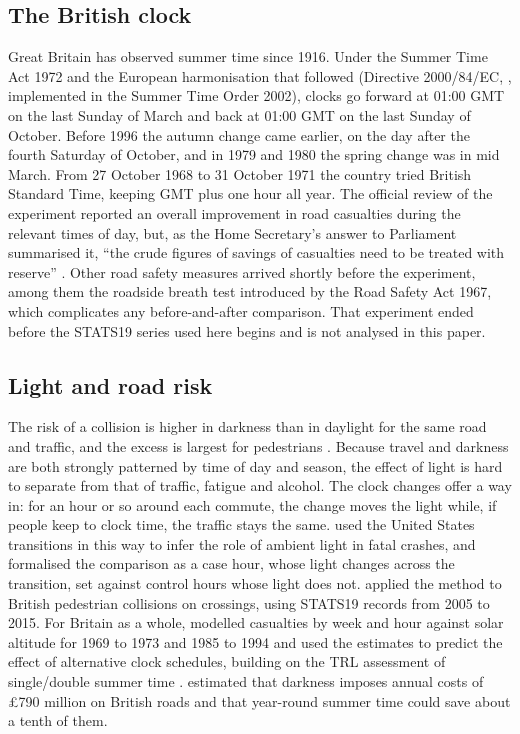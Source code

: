\documentclass[11pt,a4paper]{article}
\begin{document}
\subsection{The British clock}
Great Britain has observed summer time since 1916. Under the Summer Time Act 1972 \citep{summertimeact1972} and the European harmonisation that followed (Directive 2000/84/EC, \citealp{eu2001}, implemented in the Summer Time Order 2002), clocks go forward at 01:00 GMT on the last Sunday of March and back at 01:00 GMT on the last Sunday of October. Before 1996 the autumn change came earlier, on the day after the fourth Saturday of October, and in 1979 and 1980 the spring change was in mid March. From 27 October 1968 to 31 October 1971 the country tried British Standard Time, keeping GMT plus one hour all year. The official review of the experiment reported an overall improvement in road casualties during the relevant times of day, but, as the Home Secretary's answer to Parliament summarised it, ``the crude figures of savings of casualties need to be treated with reserve'' \citep{homeoffice1970,hansard1970}. Other road safety measures arrived shortly before the experiment, among them the roadside breath test introduced by the Road Safety Act 1967, which complicates any before-and-after comparison. That experiment ended before the STATS19 series used here begins and is not analysed in this paper.

\subsection{Light and road risk}
The risk of a collision is higher in darkness than in daylight for the same road and traffic, and the excess is largest for pedestrians \citep{plainis2006,sullivan2007}. Because travel and darkness are both strongly patterned by time of day and season, the effect of light is hard to separate from that of traffic, fatigue and alcohol. The clock changes offer a way in: for an hour or so around each commute, the change moves the light while, if people keep to clock time, the traffic stays the same. \citet{sullivan2002} used the United States transitions in this way to infer the role of ambient light in fatal crashes, and \citet{johansson2009} formalised the comparison as a case hour, whose light changes across the transition, set against control hours whose light does not. \citet{uttley2017aap} applied the method to British pedestrian collisions on crossings, using STATS19 records from 2005 to 2015. For Britain as a whole, \citet{broughton1999} modelled casualties by week and hour against solar altitude for 1969 to 1973 and 1985 to 1994 and used the estimates to predict the effect of alternative clock schedules, building on the TRL assessment of single/double summer time \citep{broughton1998}. \citet{bunnings2021} estimated that darkness imposes annual costs of £790 million on British roads and that year-round summer time could save about a tenth of them.
\end{document}
